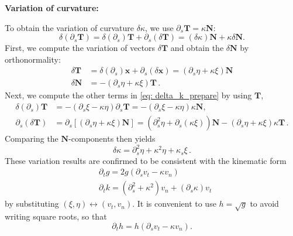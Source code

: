 \documentclass[
aip,
jcp,
reprint, 
floatfix
]{revtex4-1}
\begin{document}
{\bf Variation of curvature:}

To obtain the variation of curvature $\delta \kappa$, we use $\partial_s \mathbf{T}=\kappa \mathbf{N}$:
\begin{equation} \label{eq: delta_k_prepare}
\delta\left(\partial_s \mathbf{T}\right)
=\delta\left(\partial_s\right) \mathbf{T}+\partial_s(\delta \mathbf{T})
=(\delta \kappa) \mathbf{N}+\kappa \delta \mathbf{N}.
\end{equation}
First, we compute the variation of vectors $ \delta \mathbf{T}$ and obtain the $ \delta \mathbf{N}$ by orthonormality:
\begin{equation}
\begin{aligned}
    \delta \mathbf{T}&=\delta\left(\partial_s\right) \mathbf{x}+\partial_s(\delta \mathbf{x}) = \left(\partial_s \eta+\kappa \xi\right) \mathbf{N}\\
    \delta \mathbf{N}&=-\left(\partial_s \eta+\kappa \xi\right) \mathbf{T} \,.
\end{aligned}    
\end{equation}
Next, we compute the other terms in \eqref{eq: delta_k_prepare} by using $\mathbf{T}$, 
\begin{equation}
\begin{aligned}
\delta\left(\partial_s\right) \mathbf{T}&=-\left(\partial_s \xi-\kappa \eta\right) \partial_s \mathbf{T}=-\left(\partial_s \xi-\kappa \eta\right) \kappa \mathbf{N}, \\
\partial_s(\delta \mathbf{T})&=\partial_s\left[\left(\partial_s \eta+\kappa \xi\right) \mathbf{N}\right]=\left(\partial_s^2 \eta+\partial_s(\kappa \xi)\right) \mathbf{N}-\left(\partial_s \eta+\kappa \xi\right) \kappa \mathbf{T} \,.
\end{aligned}
\end{equation}
Comparing the $\mathbf{N}$-components then yields
\begin{equation}
\delta \kappa=\partial_s^2 \eta+\kappa^2 \eta+\kappa_s \xi\,.
\end{equation}
These variation results are confirmed to be consistent with the kinematic form 
\begin{equation}
\begin{aligned}
& \partial_t g=2 g\left(\partial_s v_t-\kappa v_n\right) \\
& \partial_t k=\left(\partial_s^2+\kappa^2\right) v_n+\left(\partial_s \kappa\right) v_t
\end{aligned}
\end{equation}
by substituting $(\xi, \eta) \leftrightarrow\left(v_t, v_n\right)$. It is convenient to use $h=\sqrt{g}$ to avoid writing square roots, so that 
\begin{equation}
    \partial_t h=h\left(\partial_s v_t-\kappa v_n\right).
\end{equation}
\end{document}
